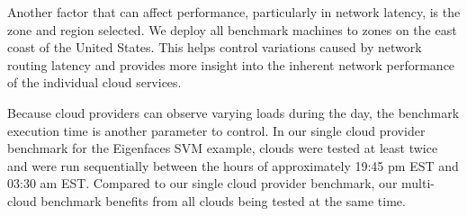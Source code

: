 Another factor that can affect performance, particularly in network
latency, is the zone and region selected. We deploy all benchmark
machines to zones on the east coast of the United States. This helps
control variations caused by network routing latency and provides more
insight into the inherent network performance of the individual cloud
services.


Because cloud providers can observe varying loads during the day, the
benchmark execution time is another parameter to control. In our
single cloud provider benchmark for the Eigenfaces SVM example, clouds
were tested at least twice and were run sequentially between the hours
of approximately 19:45 pm EST and 03:30 am EST.   Compared to our single
cloud provider benchmark, our multi-cloud benchmark benefits from all
clouds being tested at the same time.

